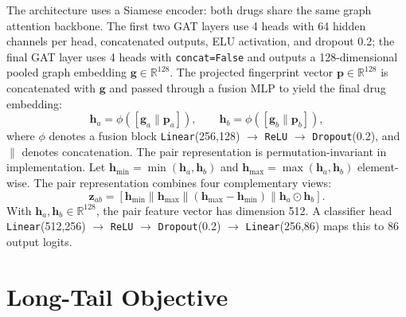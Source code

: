 \documentclass[11pt,a4paper]{report}
\begin{document}
The architecture uses a Siamese encoder: both drugs share the same graph attention backbone. The first two GAT layers use 4 heads with 64 hidden channels per head, concatenated outputs, ELU activation, and dropout 0.2; the final GAT layer uses 4 heads with \texttt{concat=False} and outputs a 128-dimensional pooled graph embedding $\mathbf{g} \in \mathbb{R}^{128}$. The projected fingerprint vector $\mathbf{p} \in \mathbb{R}^{128}$ is concatenated with $\mathbf{g}$ and passed through a fusion MLP to yield the final drug embedding:
\begin{equation}
\mathbf{h}_a = \phi([\mathbf{g}_a \| \mathbf{p}_a]), \qquad \mathbf{h}_b = \phi([\mathbf{g}_b \| \mathbf{p}_b]),
\end{equation}
where $\phi$ denotes a fusion block \texttt{Linear}(256,128) \(\rightarrow\) \texttt{ReLU} \(\rightarrow\) \texttt{Dropout}(0.2), and $\|$ denotes concatenation. The pair representation is permutation-invariant in implementation. Let $\mathbf{h}_{\min} = \min(\mathbf{h}_a,\mathbf{h}_b)$ and $\mathbf{h}_{\max} = \max(\mathbf{h}_a,\mathbf{h}_b)$ element-wise. The pair representation combines four complementary views:
\begin{equation}
\mathbf{z}_{ab} = [\mathbf{h}_{\min} \| \mathbf{h}_{\max} \| (\mathbf{h}_{\max} - \mathbf{h}_{\min}) \| \mathbf{h}_a \odot \mathbf{h}_b].
\end{equation}
With $\mathbf{h}_a, \mathbf{h}_b \in \mathbb{R}^{128}$, the pair feature vector has dimension 512. A classifier head \texttt{Linear}(512,256) \(\rightarrow\) \texttt{ReLU} \(\rightarrow\) \texttt{Dropout}(0.2) \(\rightarrow\) \texttt{Linear}(256,86) maps this to 86 output logits.

\section{Long-Tail Objective}
\end{document}
